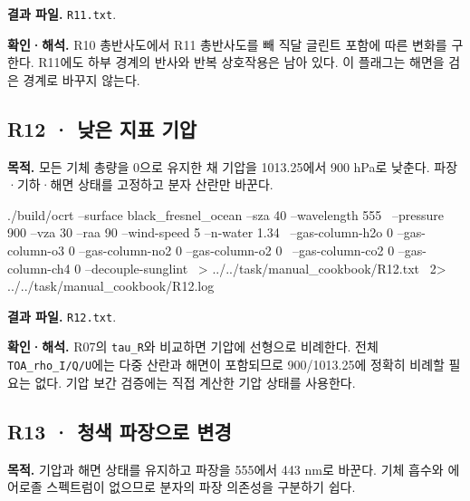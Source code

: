 \textbf{결과 파일. }\texttt{R11.txt}.

\textbf{확인·해석. }R10 총반사도에서 R11 총반사도를 빼 직달 글린트 포함에 따른 변화를 구한다. R11에도 하부 경계의 반사와 반복 상호작용은 남아 있다. 이 플래그는 해면을 검은 경계로 바꾸지 않는다.


\subsection{R12 · 낮은 지표 기압}
\label{sec:auto:09_cookbook:3.6}

\label{recipe:R12}

\textbf{목적. }모든 기체 총량을 0으로 유지한 채 기압을 1013.25에서 900 hPa로 낮춘다. 파장·기하·해면 상태를 고정하고 분자 산란만 바꾼다.

\noindent\begin{minipage}{\linewidth}
\begin{ManualCode}

./build/ocrt --surface black_fresnel_ocean --sza 40 --wavelength 555 \
  --pressure 900 --vza 30 --raa 90 --wind-speed 5 --n-water 1.34 \
  --gas-column-h2o 0 --gas-column-o3 0 --gas-column-no2 0 --gas-column-o2 0 \
  --gas-column-co2 0 --gas-column-ch4 0 --decouple-sunglint \
  > ../../task/manual_cookbook/R12.txt \
  2> ../../task/manual_cookbook/R12.log

\end{ManualCode}
\end{minipage}\par

\textbf{결과 파일. }\texttt{R12.txt}.

\textbf{확인·해석. }R07의 \texttt{tau\_\allowbreak{}R}와 비교하면 기압에 선형으로 비례한다. 전체 \texttt{TOA\_\allowbreak{}rho\_\allowbreak{}I/\allowbreak{}Q/\allowbreak{}U}에는 다중 산란과 해면이 포함되므로 900/1013.25에 정확히 비례할 필요는 없다. 기압 보간 검증에는 직접 계산한 기압 상태를 사용한다.


\subsection{R13 · 청색 파장으로 변경}
\label{sec:auto:09_cookbook:3.7}

\label{recipe:R13}

\textbf{목적. }기압과 해면 상태를 유지하고 파장을 555에서 443 nm로 바꾼다. 기체 흡수와 에어로졸 스펙트럼이 없으므로 분자의 파장 의존성을 구분하기 쉽다.

